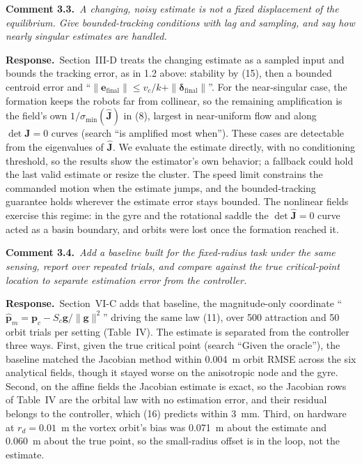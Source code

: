 \documentclass[10pt]{article}
\newcommand{\rev}[1]{#1}                             %
\newcommand{\cmt}[2]{\textbf{Comment #1.}~\textit{#2}\par}
\newcommand{\resp}{\par\textbf{Response.}~}
\begin{document}
\cmt{3.3}{A changing, noisy estimate is not a fixed displacement of the equilibrium. Give bounded-tracking conditions with lag and sampling, and say how nearly singular estimates are handled.}

\resp Section~III-D treats the changing estimate as a sampled input and bounds the tracking error, as in 1.2 above: stability by (15), then a bounded centroid error and ``$\|\mathbf{e}_{\text{final}}\| \le v_c/k + \|\boldsymbol{\delta}_{\text{final}}\|$''. For the near-singular case, the formation keeps the robots far from collinear, so the remaining amplification is the field's own $1/\sigma_{\min}(\hat{\mathbf{J}})$ in (8), largest in near-uniform flow and along $\det\mathbf{J} = 0$ curves (search ``is amplified most when''). These cases are detectable from the eigenvalues of $\hat{\mathbf{J}}$. We evaluate the estimate directly, with no conditioning threshold, so the results show the estimator's own behavior; a fallback could hold the last valid estimate or resize the cluster. The speed limit constrains the commanded motion when the estimate jumps, and the bounded-tracking guarantee holds wherever the estimate error stays bounded. The nonlinear fields exercise this regime: in the gyre and the rotational saddle the $\det\hat{\mathbf{J}} = 0$ curve acted as a basin boundary, and orbits were lost once the formation reached it.

\cmt{3.4}{Add a baseline built for the fixed-radius task under the same sensing, report over repeated trials, and compare against the true critical-point location to separate estimation error from the controller.}

\resp Section~VI-C adds that baseline, the magnitude-only coordinate ``$\hat{\mathbf{p}}_m = \mathbf{p}_c - S_c\mathbf{g}/\|\mathbf{g}\|^2$'' driving the same law (11), over \rev{500} attraction and \rev{50} orbit trials per setting (Table~IV). The estimate is separated from the controller three ways. First, given the true critical point (search ``Given the oracle''), the baseline matched the Jacobian method within \rev{0.004}~m orbit RMSE across the six analytical fields, though it stayed worse on the anisotropic node and the gyre. Second, on the affine fields the Jacobian estimate is exact, so the Jacobian rows of Table~IV are the orbital law with no estimation error, and their residual belongs to the controller, which (16) predicts within \rev{3}~mm. Third, on hardware at $r_d = 0.01$~m the vortex orbit's bias was \rev{0.071}~m about the estimate and \rev{0.060}~m about the true point, so the small-radius offset is in the loop, not the estimate.
\end{document}
